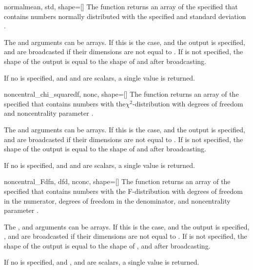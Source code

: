 \begin{funcdesc}{normal}{mean, std, shape=[]}
   The  function returns an array of the specified 
   that contains  numbers normally distributed with the specified
    and standard deviation . 
   
   The  and  arguments can be arrays. If this is the
   case, and the output  is specified,  and 
   are broadcasted if their dimensions are not equal to . If
    is not specified, the shape of the output is equal to the shape
   of  and  after broadcasting.
   
   If no  is specified, and  and  are scalars, a
   single value is returned.
\end{funcdesc}

\begin{funcdesc}{noncentral_chi_square}{df, nonc, shape=[]}
   The  function returns an array of the
   specified  that contains  numbers with
   the$\chi^2$-distribution with  degrees of freedom and noncentrality
   parameter .
   
   The  and  arguments can be arrays. If this is the case,
   and the output  is specified,  and  are
   broadcasted if their dimensions are not equal to . If 
   is not specified, the shape of the output is equal to the shape of 
   and  after broadcasting.
   
   If no  is specified, and  and  are scalars, a
   single value is returned.
\end{funcdesc}

\begin{funcdesc}{noncentral_F}{dfn, dfd, nconc, shape=[]}
   The  function returns an array of the specified
    that contains  numbers with the F-distribution with
    degrees of freedom in the numerator,  degrees of freedom
   in the denominator, and noncentrality parameter .
   
   The ,  and  arguments can be arrays. If this is
   the case, and the output  is specified, ,  and
    are broadcasted if their dimensions are not equal to .
   If  is not specified, the shape of the output is equal to the
   shape of ,  and  after broadcasting.
   
   If no  is specified, and ,  and  are
   scalars, a single value is returned.
\end{funcdesc}

